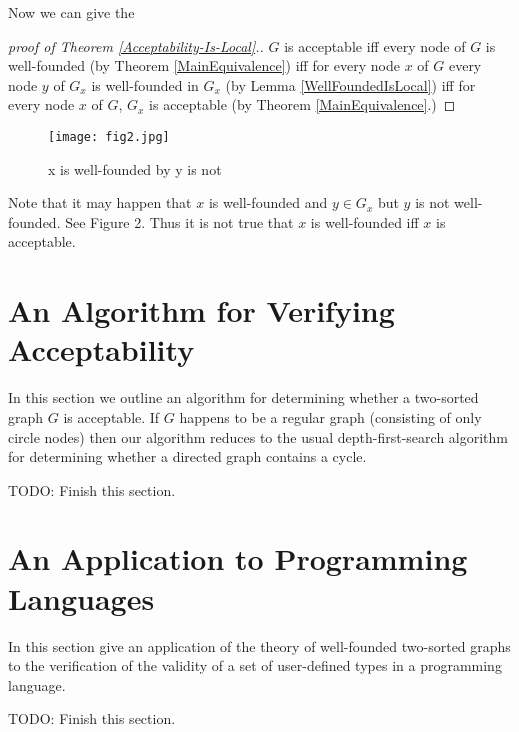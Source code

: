\documentclass[oneside,12pt]{amsart}
\begin{document}
Now we can give the

\begin{proof}[proof of Theorem \ref{Acceptability-Is-Local}.]
$G$ is acceptable iff every node of $G$ is well-founded (by Theorem \ref{MainEquivalence})
iff for every node $x$ of $G$ every node $y$ of $G_x$ is well-founded in $G_x$ (by Lemma \ref{WellFoundedIsLocal})
iff for every node $x$ of $G$, $G_x$ is acceptable (by Theorem \ref{MainEquivalence}.)
\end{proof}

\begin{figure}[h]
    \centering
    \texttt{[image: fig2.jpg]}
    \caption{x is well-founded by y is not}
    \label{fig:fig2}
\end{figure}

Note that it may happen that $x$ is well-founded and $y\in G_x$ but $y$ is not well-founded. 
See Figure 2. Thus it is not true
that $x$ is well-founded iff $x$ is acceptable. 

\FloatBarrier


\section{An Algorithm for Verifying Acceptability}
In this section we outline an algorithm for determining whether a two-sorted graph $G$ is acceptable.
If $G$ happens to be a regular graph (consisting of only circle nodes) then our algorithm reduces
to the usual depth-first-search algorithm for determining whether a directed graph contains a cycle.

TODO: Finish this section.

\section{An Application to Programming Languages}
In this section give an application of the theory of well-founded two-sorted graphs to the verification of the validity
of a set of user-defined types in a programming language.

TODO: Finish this section.
\end{document}
